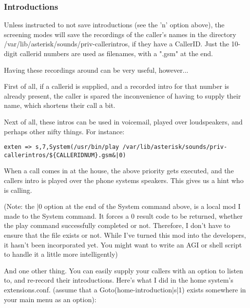 \subsubsection{Introductions}
Unless instructed to not save introductions (see the 'n' option above),
the screening modes will save the recordings of the caller's names in
the directory /var/lib/asterisk/sounds/priv-callerintros, if they have
a CallerID.  Just the 10-digit callerid numbers are used as filenames,
with a ".gsm" at the end.

Having these recordings around can be very useful, however...

First of all, if a callerid is supplied, and a recorded intro for that
number is already present, the caller is spared the inconvenience of
having to supply their name, which shortens their call a bit.

Next of all, these intros can be used in voicemail, played over
loudspeakers, and perhaps other nifty things. For instance:

\begin{verbatim}
exten => s,7,System(/usr/bin/play /var/lib/asterisk/sounds/priv-callerintros/${CALLERIDNUM}.gsm&|0) 
\end{verbatim}

When a call comes in at the house, the above priority gets executed,
and the callers intro is played over the phone systems speakers. This
gives us a hint who is calling.

(Note: the |0 option at the end of the System command above, is a
local mod I made to the System command. It forces a 0 result code to
be returned, whether the play command successfully completed or
not. Therefore, I don't have to ensure that the file exists or
not. While I've turned this mod into the developers, it hasn't been
incorporated yet. You might want to write an AGI or shell script to
handle it a little more intelligently)

And one other thing. You can easily supply your callers with an option
to listen to, and re-record their introductions. Here's what I did in
the home system's extensions.conf. (assume that a
Goto(home-introduction|s|1) exists somewhere in your main menu as an
option):

